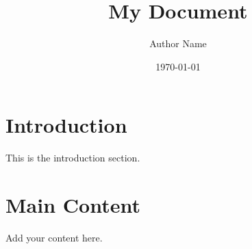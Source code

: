 \documentclass{article}
\title{My Document}
\author{Author Name}
\date{\today}
\begin{document}
\maketitle

\section{Introduction}
This is the introduction section.

\section{Main Content}
Add your content here.
\end{document}
